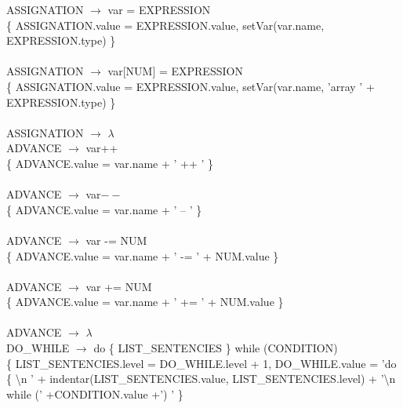 \documentclass[10pt,a4paper]{article}
\begin{document}
{{{ASSIGNATION $\rightarrow$ var = EXPRESSION \\  

\{ ASSIGNATION.value = EXPRESSION.value, setVar(var.name, EXPRESSION.type) \}  \\ \\

ASSIGNATION $\rightarrow$ var[NUM] = EXPRESSION  \\

\{ ASSIGNATION.value = EXPRESSION.value, setVar(var.name, 'array ' + EXPRESSION.type) \}  \\ \\

ASSIGNATION $\rightarrow$ $\lambda$ \\


ADVANCE $\rightarrow$ var++   \\

\{ ADVANCE.value = var.name + ' ++ ' \}  \\ \\


ADVANCE $\rightarrow$ var$--$   \\

\{ ADVANCE.value = var.name + ' -- ' \}  \\ \\


ADVANCE $\rightarrow$ var -= NUM  \\ 

\{ ADVANCE.value = var.name + ' -= ' + NUM.value \}  \\ \\


ADVANCE $\rightarrow$ var += NUM  \\

\{ ADVANCE.value = var.name + ' += ' + NUM.value \}  \\ \\


ADVANCE $\rightarrow$ $\lambda$ \\

DO\_WHILE $\rightarrow$ do \{ LIST\_SENTENCIES \} while (CONDITION) \\

\{ LIST\_SENTENCIES.level = DO\_WHILE.level + 1, DO\_WHILE.value = 'do \{ \textbackslash{}n ' +  indentar(LIST\_SENTENCIES.value, LIST\_SENTENCIES.level)  + '\textbackslash{}n while (' +CONDITION.value +') ' \} \\ \\



}}}
\end{document}
